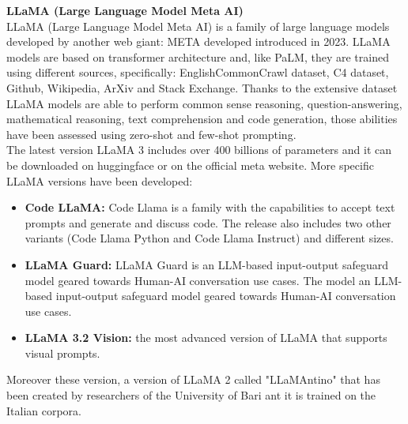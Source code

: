 \textbf{LLaMA (Large Language Model Meta AI)}\\
LLaMA (Large Language Model Meta AI) is a family of large language models developed by another web giant: META developed introduced in 2023. LLaMA models are based on transformer architecture and, like PaLM, they are trained using different sources, specifically: EnglishCommonCrawl dataset, C4 dataset, Github, Wikipedia, ArXiv and Stack Exchange.  Thanks to the extensive dataset LLaMA models are able to perform common sense reasoning, question-answering, mathematical reasoning, text comprehension and code generation, those abilities have been assessed using zero-shot and few-shot prompting. \cite{touvron2023llama}\\The latest version LLaMA 3 includes over 400 billions of parameters\cite{llama3_intro} and it can be downloaded on huggingface or on the official meta website. More specific LLaMA versions have been developed:
\begin{itemize}
    \item \textbf{Code LLaMA:} Code Llama is a family with the capabilities to accept text prompts and generate and discuss code. The release also includes two other variants (Code Llama Python and Code Llama Instruct) and different sizes.
    \item \textbf{LLaMA Guard:} LLaMA Guard is an LLM-based input-output safeguard model geared towards Human-AI conversation use cases. The model an LLM-based input-output safeguard model geared towards Human-AI conversation use cases.
    \item \textbf{LLaMA 3.2 Vision:} the most advanced version of LLaMA that supports visual prompts.
\end{itemize}
Moreover these version, a version of LLaMA 2 called "LLaMAntino"\cite{basile2023llamantino} that has been created by researchers of the University of Bari ant it is trained on the Italian corpora.\\

